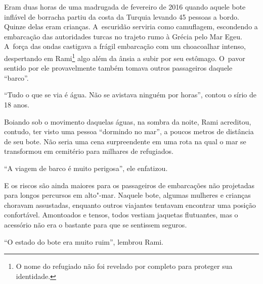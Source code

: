 

\putodd{}

\clearpage

 
% 
% 
Eram duas horas de uma madrugada de fevereiro de 2016 quando aquele bote
inflável de borracha partiu da costa da Turquia levando 45 pessoas a
bordo. Quinze delas eram crianças. A~escuridão serviria como camuflagem,
escondendo a embarcação das autoridades turcas no trajeto rumo à Grécia
pelo Mar Egeu. A~força das ondas castigava a frágil embarcação com um
choacoalhar intenso, despertando em Rami\footnote{ O nome do refugiado não foi revelado por completo
para proteger sua identidade.}  algo além da ânsia a subir por seu estômago. O~pavor sentido por ele provavelmente
também tomava outros passageiros  daquele ``barco''.  



``Tudo o que se via é água. Não se avistava ninguém por horas'', contou o
sírio de 18 anos.

Boiando sob o movimento daquelas águas, na sombra da noite, Rami
acreditou, contudo, ter visto uma pessoa ``dormindo no mar'', a poucos
metros de distância de seu bote. Não seria uma cena surpreendente em uma
rota na qual o mar se transformou em cemitério para milhares de
refugiados.

``A viagem de barco é muito perigosa'', ele enfatizou.

E os riscos são ainda maiores para os passageiros de embarcações não
projetadas para longos percursos em alto"-mar. Naquele bote, algumas
mulheres e crianças choravam assustadas, enquanto outros viajantes
tentavam encontrar uma posição confortável. Amontoados e tensos, todos
vestiam jaquetas flutuantes, mas o acessório não era o bastante para que
se sentissem seguros.

``O estado do bote era muito ruim'', lembrou Rami.

